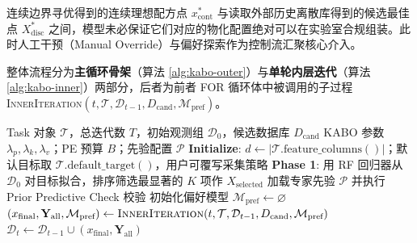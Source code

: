 \documentclass[12pt,a4paper]{article}
\begin{document}
连续边界寻优得到的连续理想配方点 $x^*_{\text{cont}}$ 与读取外部历史离散库得到的候选最佳点 $X^*_{\text{disc}}$ 之间，模型未必保证它们对应的物化配置绝对可以在实验室合规组装。此时人工干预（Manual Override）与偏好探索作为控制流汇聚核心介入。

整体流程分为\textbf{主循环骨架}（算法 \ref{alg:kabo-outer}）与\textbf{单轮内层迭代}（算法 \ref{alg:kabo-inner}）两部分，后者为前者 FOR 循环体中被调用的子过程 \textsc{InnerIteration}$(t, \mathcal{T}, \mathcal{D}_{t-1}, D_{\text{cand}}, \mathcal{M}_{\text{pref}})$。

\begin{algorithm}[H]
\caption{KABO 主循环骨架（适用于任意 \texttt{TaskBase} 子类）}
\label{alg:kabo-outer}
\begin{algorithmic}[1]
\REQUIRE Task 对象 $\mathcal{T}$，总迭代数 $T$，初始观测组 $\mathcal{D}_0$，候选数据库 $D_{\text{cand}}$
\REQUIRE KABO 参数 $\lambda_p, \lambda_k, \lambda_v$；PE 预算 $B$；先验配置 $\mathcal{P}$
\STATE \textbf{Initialize}: $d \leftarrow |\mathcal{T}.\text{feature\_columns}()|$；默认目标取 $\mathcal{T}.\text{default\_target}()$，用户可覆写采集策略
\STATE \textbf{Phase 1}: 用 RF 回归器从 $\mathcal{D}_0$ 对目标拟合，排序筛选最显著的 $K$ 项作 $X_{\text{selected}}$
\STATE 加载专家先验 $\mathcal{P}$ 并执行 Prior Predictive Check 校验
\STATE 初始化偏好模型 $\mathcal{M}_{\text{pref}} \leftarrow \varnothing$
    \STATE $(x_{\text{final}}, \mathbf{Y}_{\text{all}}, \mathcal{M}_{\text{pref}}) \leftarrow \textsc{InnerIteration}(t, \mathcal{T}, \mathcal{D}_{t-1}, D_{\text{cand}}, \mathcal{M}_{\text{pref}})$
    \STATE $\mathcal{D}_t \leftarrow \mathcal{D}_{t-1} \cup (x_{\text{final}}, \mathbf{Y}_{\text{all}})$
\ENDFOR
\end{algorithmic}
\end{algorithm}
\end{document}
